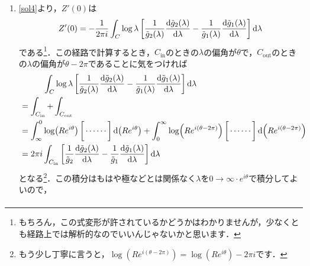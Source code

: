 \documentclass[a4paper,pdflatex,ja=standard]{bxjsarticle}
\begin{document}
\begin{enumerate}
\begin{enumerate}
    \item 
    \eqref{sol4}より，$Z'(0)$は
    \begin{equation}
      Z'(0)
      =
      -\frac{1}{2\pi i}
      \int_{C}
      \log \lambda
      \left[  
        \frac{1}{\tilde{g}_{2}(\lambda)}\dv{\tilde{g}_{2}(\lambda)}{\lambda}
        -
        \frac{1}{\tilde{g}_{1}(\lambda)}\dv{\tilde{g}_{1}(\lambda)}{\lambda}
      \right]
      \dd \lambda
    \end{equation}
    である\footnote{もちろん，この式変形が許されているかどうかはわかりませんが，少なくとも経路上では解析的なのでいいんじゃないかと思います．}．この経路で計算するとき，$C_{\text{in}}$のときの$\lambda$の偏角が$\theta$で，$C_{\text{out}}$のときの$\lambda$の偏角が$\theta-2\pi$であることに気をつければ
    \begin{align}
      &\hspace{1cm}
      \int_{C}
      \log \lambda
      \left[  
        \frac{1}{\tilde{g}_{2}(\lambda)}\dv{\tilde{g}_{2}(\lambda)}{\lambda}
        -
        \frac{1}{\tilde{g}_{1}(\lambda)}\dv{\tilde{g}_{1}(\lambda)}{\lambda}
      \right]
      \dd \lambda
      \nonumber
      \\
      &=
      \int_{C_{\text{in}}}+\int_{C_{\text{out}}}
      \nonumber
      \\
      &=
      \int_{\infty}^{0}
      \log (Re^{i\theta})
      \left[  
        \vphantom{\frac{1}{\tilde{g}_{2}(\lambda)}\dv{\tilde{g}_{2}(\lambda)}{\lambda}
        -
        \frac{1}{\tilde{g}_{1}(\lambda)}\dv{\tilde{g}_{1}(\lambda)}{\lambda}}
        \cdots\cdots
      \right]
      \dd (Re^{i\theta})
      +
      \int_{0}^{\infty}
      \log (Re^{i(\theta-2\pi)})
      \left[  
        \vphantom{\frac{1}{\tilde{g}_{2}(\lambda)}\dv{\tilde{g}_{2}(\lambda)}{\lambda}
        -
        \frac{1}{\tilde{g}_{1}(\lambda)}\dv{\tilde{g}_{1}(\lambda)}{\lambda}}
        \cdots\cdots
      \right]
      \dd (Re^{i(\theta-2\pi)})
      \nonumber
      \\
      &=
      2\pi i
      \int_{C_{\text{in}}}
      \left[  
        \frac{1}{\tilde{g}_{2}}\dv{\tilde{g}_{2}(\lambda)}{\lambda}
        -
        \frac{1}{\tilde{g}_{1}}\dv{\tilde{g}_{1}(\lambda)}{\lambda}
      \right]
      \dd \lambda
    \end{align}
    となる\footnote{もう少し丁寧に言うと，$\log(Re^{i(\theta-2\pi)})=\log (Re^{i\theta})-2\pi i$です．}．この積分はもはや極などとは関係なく$\lambda$を$0\rightarrow\infty\cdot e^{i\theta}$で積分してよいので，
    \begin{align}

\end{align}
\end{enumerate}
\end{enumerate}
\end{document}

